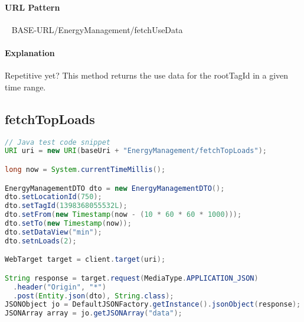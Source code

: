 \documentclass[
10pt, %
letterpaper, %
oneside, %
headinclude,footinclude, %
BCOR5mm, %
]{scrartcl}
\begin{document}
\paragraph{URL Pattern} 
~\newline
BASE-URL/EnergyManagement/fetchUseData

\paragraph{Explanation} Repetitive yet? This method returns the use data for the rootTagId in a given time range.


\subsection{\textbf{fetchTopLoads}}

\begin{lstlisting}[language=Java]
// Java test code snippet
URI uri = new URI(baseUri + "EnergyManagement/fetchTopLoads");        

long now = System.currentTimeMillis();

EnergyManagementDTO dto = new EnergyManagementDTO();
dto.setLocationId(750);
dto.setTagId(1398368055532L);
dto.setFrom(new Timestamp(now - (10 * 60 * 60 * 1000)));
dto.setTo(new Timestamp(now));
dto.setDataView("min");
dto.setnLoads(2);

WebTarget target = client.target(uri);

String response = target.request(MediaType.APPLICATION_JSON)
  .header("Origin", "*")
  .post(Entity.json(dto), String.class);
JSONObject jo = DefaultJSONFactory.getInstance().jsonObject(response);
JSONArray array = jo.getJSONArray("data");
\end{lstlisting}

\end{document}
